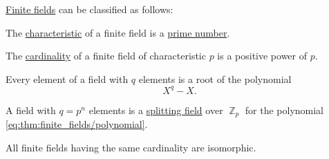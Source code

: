\begin{theorem}\label{thm:finite_fields}
  \hyperref[def:finite_field]{Finite fields} can be classified as follows:
  \begin{thmenum}
     The \hyperref[def:ring_characteristic]{characteristic} of a finite field is a \hyperref[def:prime_number]{prime number}.

     The \hyperref[def:cardinality]{cardinality} of a finite field of characteristic \( p \) is a positive power of \( p \).

     Every element of a field with \( q \) elements is a root of the polynomial
    \begin{equation}\label{eq:thm:finite_fields/polynomial}
      X^q - X.
    \end{equation}

     A field with \( q = p^n \) elements is a \hyperref[def:splitting_field]{splitting field} over \( \BbbZ_p \) for the polynomial \eqref{eq:thm:finite_fields/polynomial}.

     All finite fields having the same cardinality are isomorphic.
  \end{thmenum}
\end{theorem}
